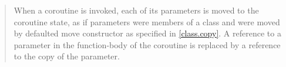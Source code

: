 \begin{quote}

\pnum
When a coroutine is invoked, each of its parameters is moved to the coroutine state, as if parameters were members of a class and were moved by defaulted move constructor as specified in \ref{class.copy}.  
A reference to a parameter in the function-body of the coroutine is replaced by a reference to the copy of the parameter.

%
%







\end{quote}
